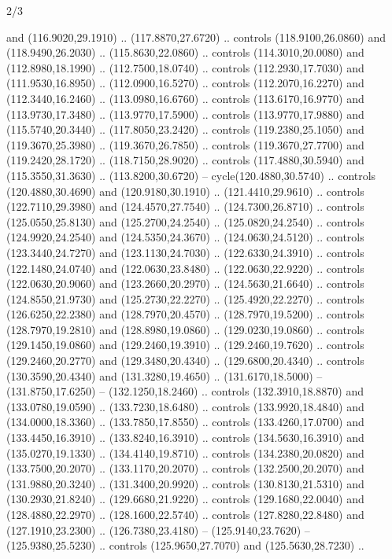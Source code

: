 \begin{flagdescription}{2/3}
\begin{scope}[xshift=0.5\flaglength,yshift=0.5\flagwidth,scale=\stretchfactor]
\begin{scope}[scale=0.001645\flagwidth,yshift=65mm,xshift=-63mm]
\begin{scope}[y=0.80pt, x=0.80pt, yscale=-1,]
\begin{scope}[cm={{1.33333,0.0,0.0,1.33333,(0.0,1e-05)}}]
  and (116.9020,29.1910) .. (117.8870,27.6720) .. controls (118.9100,26.0860)
  and (118.9490,26.2030) .. (115.8630,22.0860) .. controls (114.3010,20.0080)
  and (112.8980,18.1990) .. (112.7500,18.0740) .. controls (112.2930,17.7030)
  and (111.9530,16.8950) .. (112.0900,16.5270) .. controls (112.2070,16.2270)
  and (112.3440,16.2460) .. (113.0980,16.6760) .. controls (113.6170,16.9770)
  and (113.9730,17.3480) .. (113.9770,17.5900) .. controls (113.9770,17.9880)
  and (115.5740,20.3440) .. (117.8050,23.2420) .. controls (119.2380,25.1050)
  and (119.3670,25.3980) .. (119.3670,26.7850) .. controls (119.3670,27.7700)
  and (119.2420,28.1720) .. (118.7150,28.9020) .. controls (117.4880,30.5940)
  and (115.3550,31.3630) .. (113.8200,30.6720) -- cycle(120.4880,30.5740) ..
  controls (120.4880,30.4690) and (120.9180,30.1910) .. (121.4410,29.9610) ..
  controls (122.7110,29.3980) and (124.4570,27.7540) .. (124.7300,26.8710) ..
  controls (125.0550,25.8130) and (125.2700,24.2540) .. (125.0820,24.2540) ..
  controls (124.9920,24.2540) and (124.5350,24.3670) .. (124.0630,24.5120) ..
  controls (123.3440,24.7270) and (123.1130,24.7030) .. (122.6330,24.3910) ..
  controls (122.1480,24.0740) and (122.0630,23.8480) .. (122.0630,22.9220) ..
  controls (122.0630,20.9060) and (123.2660,20.2970) .. (124.5630,21.6640) ..
  controls (124.8550,21.9730) and (125.2730,22.2270) .. (125.4920,22.2270) ..
  controls (126.6250,22.2380) and (128.7970,20.4570) .. (128.7970,19.5200) ..
  controls (128.7970,19.2810) and (128.8980,19.0860) .. (129.0230,19.0860) ..
  controls (129.1450,19.0860) and (129.2460,19.3910) .. (129.2460,19.7620) ..
  controls (129.2460,20.2770) and (129.3480,20.4340) .. (129.6800,20.4340) ..
  controls (130.3590,20.4340) and (131.3280,19.4650) .. (131.6170,18.5000) --
  (131.8750,17.6250) -- (132.1250,18.2460) .. controls (132.3910,18.8870) and
  (133.0780,19.0590) .. (133.7230,18.6480) .. controls (133.9920,18.4840) and
  (134.0000,18.3360) .. (133.7850,17.8550) .. controls (133.4260,17.0700) and
  (133.4450,16.3910) .. (133.8240,16.3910) .. controls (134.5630,16.3910) and
  (135.0270,19.1330) .. (134.4140,19.8710) .. controls (134.2380,20.0820) and
  (133.7500,20.2070) .. (133.1170,20.2070) .. controls (132.2500,20.2070) and
  (131.9880,20.3240) .. (131.3400,20.9920) .. controls (130.8130,21.5310) and
  (130.2930,21.8240) .. (129.6680,21.9220) .. controls (129.1680,22.0040) and
  (128.4880,22.2970) .. (128.1600,22.5740) .. controls (127.8280,22.8480) and
  (127.1910,23.2300) .. (126.7380,23.4180) -- (125.9140,23.7620) --
  (125.9380,25.5230) .. controls (125.9650,27.7070) and (125.5630,28.7230) ..

\end{scope}
\end{scope}
\end{scope}
\end{scope}
\end{flagdescription}
